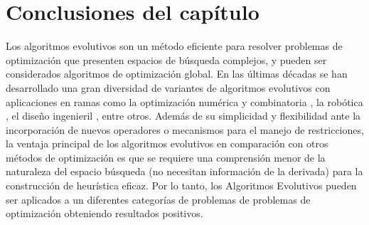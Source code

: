 \section{Conclusiones del capítulo}
Los algoritmos evolutivos son un método eficiente para resolver problemas de optimización que presenten espacios de búsqueda complejos, y  pueden ser considerados algoritmos de optimización global.  En las últimas décadas se han desarrollado una gran diversidad de variantes de algoritmos evolutivos con aplicaciones en ramas como la optimización numérica y combinatoria  \cite{wright1991genetic} \cite{han2000genetic}, la robótica \cite{nolfi2016evolutionary} \cite{wang2016double},  el diseño ingenieril \cite{yildiz2013comparison}\cite{dasgupta2013evolutionary}, entre otros.
Además de su simplicidad y flexibilidad ante la incorporación de nuevos operadores o mecanismos para el manejo de restricciones, la ventaja principal de los algoritmos evolutivos en comparación con otros métodos de optimización es que se requiere una comprensión menor de la naturaleza del espacio búsqueda (no necesitan información de la derivada) para la construcción de heurística eficaz. Por lo tanto, los Algoritmos Evolutivos pueden ser aplicados a un diferentes categorías de problemas de problemas de optimización obteniendo resultados positivos.




